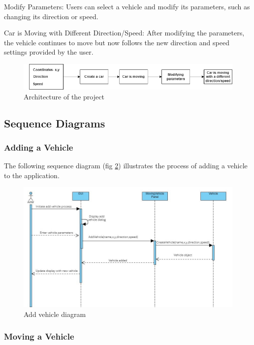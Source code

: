 \documentclass{article}
\begin{document}
Modify Parameters: Users can select a vehicle and modify its parameters, such as changing its direction or speed. 

Car is Moving with Different Direction/Speed: After modifying the parameters, the vehicle continues to move but now follows the new direction and speed settings provided by the user. 

\begin{figure}[h]
    \centering
    \includegraphics[width=1\textwidth]{images/Arhitecture.png}
    \caption{Architecture of the project}
    \label{fig:rendszer_blokk}
\end{figure}


\subsection{Sequence Diagrams}

\subsubsection{Adding a Vehicle}

The following sequence diagram (fig \ref{fig:add_vehicle_diagram}) illustrates the process of adding a vehicle to the application.


\begin{figure}[h]
    \centering
    \includegraphics[width=1\textwidth]{images/Add vehicle diagram.jpg}
    \caption{Add vehicle diagram}
    \label{fig:add_vehicle_diagram}
\end{figure}

\newpage
\subsubsection{Moving a Vehicle}
\end{document}
